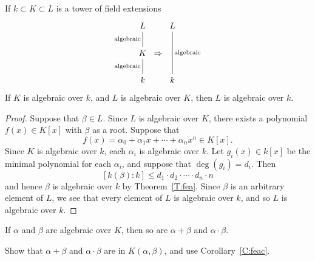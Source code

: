 \documentclass{ximera}
\begin{document}
\begin{corollary}\label{C:feac}
  If $k\subset K\subset L$ is a tower of field extensions
  \[
  \begin{tikzcd}[column sep=0pt]
    L\ar[d,-,"\text{algebraic}",swap] & & L\ar[dd,-,"\text{algebraic}"]\\
    K \ar[d,-,"\text{algebraic}",swap] & \Rightarrow& \\
    k & \vphantom{K} & k
  \end{tikzcd}
  \]
  If $K$ is algebraic over $k$, and $L$ is algebraic over $K$, then $L$
  is algebraic over $k$.
  \begin{proof}
    Suppose that $\beta\in L$. Since $L$ is algebraic over $K$, there
    exists a polynomial $f(x)\in K[x]$ with $\beta$ as a root. Suppose that
    \[
    f(x) = \alpha_0 + \alpha_1 x + \cdots + \alpha_n x^n \in K[x].
    \]
    Since $K$ is algebraic over $k$, each $\alpha_i$ is algebraic over
    $k$. Let $g_i(x)\in k[x]$ be the minimal polynomial for each
    $\alpha_i$, and suppose that $\deg(g_i) = d_i$. Then
    \[
    [k(\beta):k]\le d_1\cdot d_2 \cdot \cdots \cdot d_n \cdot n
    \]
    and hence $\beta$ is algebraic over $k$ by
    Theorem~\ref{T:fea}. Since $\beta$ is an arbitrary element of $L$,
    we see that every element of $L$ is algebraic over $k$, and so $L$
    is algebraic over $k$.
  \end{proof}
\end{corollary}









\begin{corollary}
  If $\alpha$ and $\beta$ are algebraic over $K$, then so are
  $\alpha+\beta$ and $\alpha\cdot \beta$.
  \begin{sketch}
    Show that $\alpha+\beta$ and $\alpha\cdot \beta$ are in
    $K(\alpha,\beta)$, and use Corollary~\ref{C:feac}.
  \end{sketch}
\end{corollary}
\end{document}
